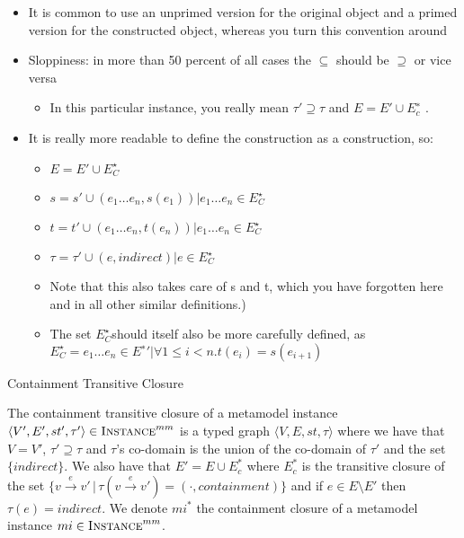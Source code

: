


\begin{itemize}
\item It is common to use an unprimed version for the original object and a
primed version for the constructed object, whereas you turn this convention around
\item Sloppiness: in more than 50 percent of all cases the $\subseteq$ should be $\supseteq$ or vice versa
\begin{itemize}
\item In this particular instance, you really mean $\tau' \supseteq \tau$ and $E = E' \cup E_c^∗$ .
\end{itemize}

\item It is really more readable to define the construction as a construction, so:
\begin{itemize}
\item  $E = E'\cup E^{\star}_{C}$
\item $s = s' \cup {(e_1 \dots e_n , s(e_1)) | e_1 \dots e_n \in E^{\star}_{C} }$
\item $t = t' \cup {(e_1 \dots e_n ,t(e_n )) | e_1 \dots e_n \in E^{\star}_{C} }$
\item $\tau = \tau' \cup {(e, indirect) | e \in E^{\star}_{C} }$
\end{itemize}
\begin{itemize}
\item Note that this also takes care of s and t, which you have forgotten here
and in all other similar definitions.)
\item The set $E^{\star}_{C}$should itself also be more carefully defined, as $E^{\star}_{C} = {e_1 \dots e_n \in E^∗' | \forall1 \leq i < n.t(e_i ) = s(e_{i+1} )}$
\end{itemize}
\end{itemize}


\begin{definition}{Containment Transitive Closure\\}
\label{def:instance_closure}

The containment transitive closure of a metamodel instance $\langle V',E',st',\tau'\rangle\in \textsc{Instance}^{mm}$ is a typed graph $\langle V,E,st,\tau\rangle$ where we have that $V=V'$, $\tau' \supseteq \tau$ and $\tau$'s co-domain is the union of the co-domain of $\tau'$ and the set $\{indirect\}$. We also have that $E' = E\cup E^*_c$ where $E^*_c$ is the transitive closure of the set $\big\{v\xrightarrow{e}v'\,|\,\tau(v\xrightarrow{e}v') = (\cdot,containment)\big\}$ and if $e\in E\setminus E'$ then $\tau(e) = indirect$.  We denote $mi^{*}$ the containment closure of a metamodel instance $mi\in \textsc{Instance}^{mm}$.

\end{definition}


